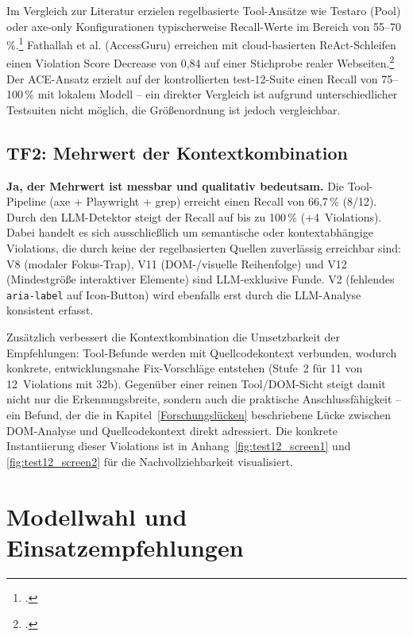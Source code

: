 Im Vergleich zur Literatur erzielen regelbasierte Tool-Ansätze wie Testaro (Pool) oder axe-only Konfigurationen typischerweise Recall-Werte im Bereich von 55--70\,\%.\footcite[Vgl.][]{kodithuwakku_assessing_2025} Fathallah et al. (AccessGuru) erreichen mit cloud-basierten ReAct-Schleifen einen Violation Score Decrease von 0,84 auf einer Stichprobe realer Webseiten.\footcite[Vgl.][]{fathallah_accessguru_2025} Der ACE-Ansatz erzielt auf der kontrollierten test-12-Suite einen Recall von 75--100\,\% mit lokalem Modell -- ein direkter Vergleich ist aufgrund unterschiedlicher Testsuiten nicht möglich, die Größenordnung ist jedoch vergleichbar.

\subsection{TF2: Mehrwert der Kontextkombination}
\label{sec:ff_tf2}

\textbf{Ja, der Mehrwert ist messbar und qualitativ bedeutsam.} Die Tool-Pipeline (axe + Playwright + grep) erreicht einen Recall von 66,7\,\% (8/12). Durch den \ac{LLM}-Detektor steigt der Recall auf bis zu 100\,\% (+4~Violations). Dabei handelt es sich ausschließlich um semantische oder kontextabhängige Violations, die durch keine der regelbasierten Quellen zuverlässig erreichbar sind: V8 (modaler Fokus-Trap), V11 (\ac{DOM}-/visuelle Reihenfolge) und V12 (Mindestgröße interaktiver Elemente) sind \ac{LLM}-exklusive Funde. V2 (fehlendes \texttt{aria-label} auf Icon-Button) wird ebenfalls erst durch die \ac{LLM}-Analyse konsistent erfasst.

Zusätzlich verbessert die Kontextkombination die Umsetzbarkeit der Empfehlungen: Tool-Befunde werden mit Quellcodekontext verbunden, wodurch konkrete, entwicklungsnahe Fix-Vorschläge entstehen (Stufe~2 für 11 von 12~Violations mit 32b). Gegenüber einer reinen Tool/\ac{DOM}-Sicht steigt damit nicht nur die Erkennungsbreite, sondern auch die praktische Anschlussfähigkeit -- ein Befund, der die in Kapitel~\ref{Forschungslücken} beschriebene Lücke zwischen \ac{DOM}-Analyse und Quellcodekontext direkt adressiert. Die konkrete Instantiierung dieser Violations ist in Anhang~\ref{fig:test12_screen1} und \ref{fig:test12_screen2} für die Nachvollziehbarkeit visualisiert.

\section{Modellwahl und Einsatzempfehlungen}
\label{sec:modellwahl}

